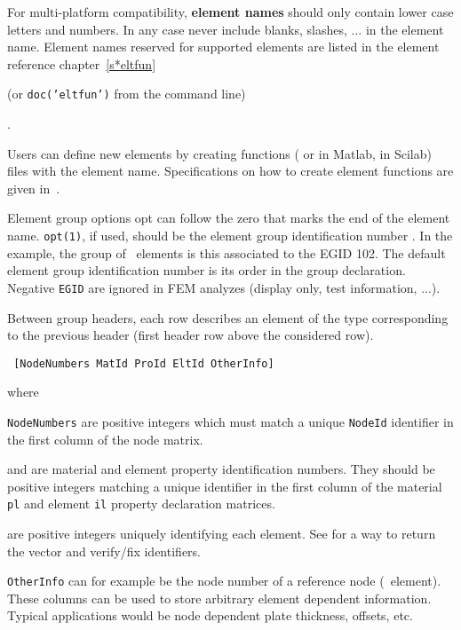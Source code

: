 For multi-platform compatibility, {\bf element names} should only contain lower case letters and numbers.  In any case never include blanks, slashes, ... in the element name.  Element names reserved for supported elements are listed in the element reference chapter~\ref{s*eltfun} \begin{SDT} (or {\tt doc('eltfun')} from the command line) \end{SDT}.


Users can define new elements by creating functions ( or  in Matlab,  in Scilab) files with the element name.  Specifications on how to create element functions are given in~. 

\lvs Element group options {\ti opt} can follow the zero that marks the end of the element name. {\tt opt(1)}, if used, should be the element group identification number .  In the example, the group of \mass\ elements is this associated to the {\ti EGID} 102.  
The default element group identification number is its order in the group declaration.  Negative {\tt EGID} are ignored in FEM analyzes (display only, test information, ...).

Between group headers, each row describes an element of the type corresponding to the previous header (first header row above the considered row).

\lvs\noindent{}%

\begin{verbatim}
 [NodeNumbers MatId ProId EltId OtherInfo]
\end{verbatim}

\noindent where

\begin{Eitem}
\item {\tt NodeNumbers} are positive integers which must match a unique {\tt NodeId} identifier in the first column of the node matrix.

\item {} and  are material and element property identification numbers. They should be positive integers matching a unique identifier in the first column of the material {\tt pl} and element {\tt il} property declaration matrices.

\item {} are positive integers uniquely identifying each element. See  for a way to return the vector and verify/fix identifiers.


\item{\tt OtherInfo} can for example be the node number of a reference node (\beam\ element). These columns can be used to store arbitrary element dependent information. Typical applications would be node dependent plate thickness, offsets, etc.


\end{Eitem}


